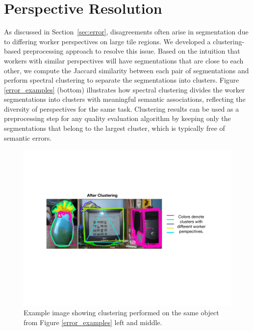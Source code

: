 \documentclass[letterpaper]{article}
\begin{document}
\section{Perspective Resolution\label{perspective}}
As discussed in Section~\ref{sec:error}, disagreements often arise in segmentation due to differing worker perspectives on large tile regions. We developed a clustering-based preprocessing approach to resolve this issue.
Based on the intuition that workers with similar perspectives will have segmentations that are close to each other, we compute the Jaccard similarity between each pair of segmentations and perform spectral clustering to separate the segmentations into clusters. Figure \ref{error_examples} (bottom) illustrates how spectral clustering divides the worker segmentations into clusters with meaningful semantic associations, reflecting the diversity of perspectives for the same task. Clustering results can be used as a preprocessing step for any quality evaluation algorithm by keeping only the segmentations that belong to the largest cluster, which is typically free of semantic errors.
\begin{figure}[h!]
  \centering
  \includegraphics[width=0.9\linewidth]{plots/clustering.pdf}
  \caption{Example image showing clustering performed on the same object from Figure \ref{error_examples} left and middle.}
  \label{cluster_example}
\end{figure}
\end{document}
